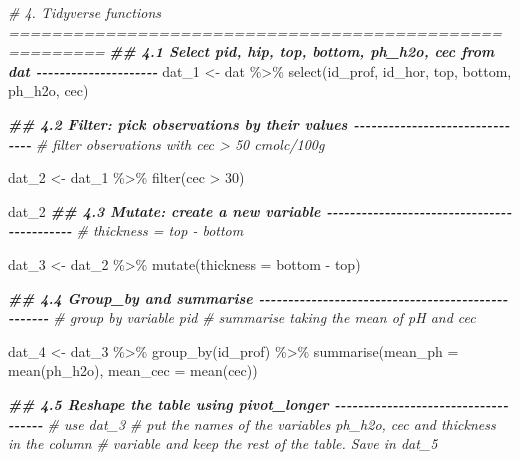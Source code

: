 \documentclass[
  10pt,
  b5paper,
  oneside]{book}
\newenvironment{Shaded}{\begin{snugshade}}{\end{snugshade}}
\newcommand{\AttributeTok}[1]{\textcolor[rgb]{0.77,0.63,0.00}{#1}}
\newcommand{\CommentTok}[1]{\textcolor[rgb]{0.56,0.35,0.01}{\textit{#1}}}
\newcommand{\DecValTok}[1]{\textcolor[rgb]{0.00,0.00,0.81}{#1}}
\newcommand{\DocumentationTok}[1]{\textcolor[rgb]{0.56,0.35,0.01}{\textbf{\textit{#1}}}}
\newcommand{\FunctionTok}[1]{\textcolor[rgb]{0.00,0.00,0.00}{#1}}
\newcommand{\NormalTok}[1]{#1}
\newcommand{\OtherTok}[1]{\textcolor[rgb]{0.56,0.35,0.01}{#1}}
\newcommand{\SpecialCharTok}[1]{\textcolor[rgb]{0.00,0.00,0.00}{#1}}
\begin{document}
\begin{Shaded}
\begin{Highlighting}[]
\CommentTok{\# 4. Tidyverse functions =======================================================}
\DocumentationTok{\#\# 4.1 Select pid, hip, top, bottom, ph\_h2o, cec from dat {-}{-}{-}{-}{-}{-}{-}{-}{-}{-}{-}{-}{-}{-}{-}{-}{-}{-}{-}{-}{-}}
\NormalTok{dat\_1 }\OtherTok{\textless{}{-}}\NormalTok{ dat }\SpecialCharTok{\%\textgreater{}\%} 
  \FunctionTok{select}\NormalTok{(id\_prof, id\_hor, top, bottom, ph\_h2o, cec)}

\DocumentationTok{\#\# 4.2 Filter: pick observations by their values {-}{-}{-}{-}{-}{-}{-}{-}{-}{-}{-}{-}{-}{-}{-}{-}{-}{-}{-}{-}{-}{-}{-}{-}{-}{-}{-}{-}{-}{-}{-}}
\CommentTok{\# filter observations with cec \textgreater{} 50 cmolc/100g}

\NormalTok{dat\_2 }\OtherTok{\textless{}{-}}\NormalTok{ dat\_1 }\SpecialCharTok{\%\textgreater{}\%} 
  \FunctionTok{filter}\NormalTok{(cec }\SpecialCharTok{\textgreater{}} \DecValTok{30}\NormalTok{)}

\NormalTok{dat\_2}
\DocumentationTok{\#\# 4.3 Mutate: create a new variable {-}{-}{-}{-}{-}{-}{-}{-}{-}{-}{-}{-}{-}{-}{-}{-}{-}{-}{-}{-}{-}{-}{-}{-}{-}{-}{-}{-}{-}{-}{-}{-}{-}{-}{-}{-}{-}{-}{-}{-}{-}{-}{-}}
\CommentTok{\# thickness = top {-} bottom}

\NormalTok{dat\_3 }\OtherTok{\textless{}{-}}\NormalTok{ dat\_2 }\SpecialCharTok{\%\textgreater{}\%} 
  \FunctionTok{mutate}\NormalTok{(}\AttributeTok{thickness =}\NormalTok{ bottom }\SpecialCharTok{{-}}\NormalTok{ top)}

\DocumentationTok{\#\# 4.4 Group\_by and summarise {-}{-}{-}{-}{-}{-}{-}{-}{-}{-}{-}{-}{-}{-}{-}{-}{-}{-}{-}{-}{-}{-}{-}{-}{-}{-}{-}{-}{-}{-}{-}{-}{-}{-}{-}{-}{-}{-}{-}{-}{-}{-}{-}{-}{-}{-}{-}{-}{-}{-}}
\CommentTok{\# group by variable pid}
\CommentTok{\# summarise taking the mean of pH and cec}

\NormalTok{dat\_4 }\OtherTok{\textless{}{-}}\NormalTok{ dat\_3 }\SpecialCharTok{\%\textgreater{}\%} 
  \FunctionTok{group\_by}\NormalTok{(id\_prof) }\SpecialCharTok{\%\textgreater{}\%} 
  \FunctionTok{summarise}\NormalTok{(}\AttributeTok{mean\_ph =} \FunctionTok{mean}\NormalTok{(ph\_h2o),}
            \AttributeTok{mean\_cec =} \FunctionTok{mean}\NormalTok{(cec))}

\DocumentationTok{\#\# 4.5 Reshape the table using pivot\_longer {-}{-}{-}{-}{-}{-}{-}{-}{-}{-}{-}{-}{-}{-}{-}{-}{-}{-}{-}{-}{-}{-}{-}{-}{-}{-}{-}{-}{-}{-}{-}{-}{-}{-}{-}{-}}
\CommentTok{\# use dat\_3}
\CommentTok{\# put the names of the variables ph\_h2o, cec and thickness in the column }
\CommentTok{\# variable and keep the rest of the table. Save in dat\_5 }


\end{Highlighting}
\end{Shaded}
\end{document}
